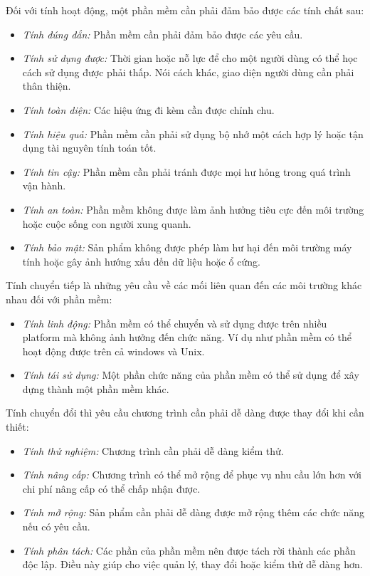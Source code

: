 \documentclass{article}
\begin{document}
Đối với tính hoạt động, một phần mềm cần phải đảm bảo được các tính chất sau:
\begin{itemize}
	\item \textit{Tính đúng đắn:} Phần mềm cần phải đảm bảo được các yêu cầu.
	\item \textit{Tính sử dụng được:} Thời gian hoặc nỗ lực để cho một người dùng có thể học cách sử dụng được phải thấp. Nói cách khác, giao diện người dùng cần phải thân thiện.
	\item \textit{Tính toàn diện:} Các hiệu ứng đi kèm cần được chỉnh chu.
	\item \textit{Tính hiệu quả:} Phần mềm cần phải sử dụng bộ nhớ một cách hợp lý hoặc tận dụng tài nguyên tính toán tốt.
	\item \textit{Tính tin cậy:} Phần mềm cần phải tránh được mọi hư hỏng trong quá trình vận hành.
	
	\item \textit{Tính an toàn:} Phần mềm không được làm ảnh hưởng tiêu cực đến môi trường hoặc cuộc sống con người xung quanh.
	\item \textit{Tính bảo mật:} Sản phẩm không được phép làm hư hại đến môi trường máy tính hoặc gây ảnh hướng xấu đến dữ liệu hoặc ổ cứng.
	\end{itemize}
	
	Tính chuyển tiếp là những yêu cầu về các mối liên quan đến các môi trường khác nhau đối với phần mềm:
	\begin{itemize}
		\item \textit{Tính linh động:} Phần mềm có thể chuyển và sử dụng được trên nhiều platform mà không ảnh hưởng đến chức năng. Ví dụ như phần mềm có thể hoạt động được trên cả windows và Unix.
		\item \textit{Tính tái sử dụng:} Một phần chức năng của phần mềm có thể sử dụng để xây dựng thành một phần mềm khác.
		\end{itemize}
		
	Tính chuyển đổi thì yêu cầu chương trình cần phải dễ dàng được thay đổi khi cần thiết:
	\begin{itemize}
		\item \textit{Tính thử nghiệm:} Chương trình cần phải dễ dàng kiểm thử.
		\item \textit{Tính nâng cấp:} Chương trình có thể mở rộng để phục vụ nhu cầu lớn hơn với chi phí nâng cấp có thể chấp nhận được.
		\item \textit{Tính mở rộng:} Sản phẩm cần phải dễ dàng được mở rộng thêm các chức năng nếu có yêu cầu.
		\item \textit{Tính phân tách:} Các phần của phần mềm nên được tách rời thành các phần độc lập. Điều này giúp cho việc quản lý, thay đổi hoặc kiểm thử dễ dàng hơn.
		\end{itemize}
\end{document}
